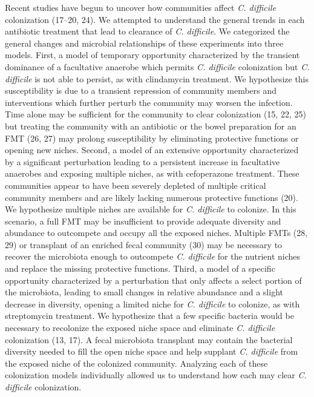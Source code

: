 \documentclass[11pt,]{article}
\begin{document}
Recent studies have begun to uncover how communities affect \emph{C.
difficile} colonization (17--20, 24). We attempted to understand the
general trends in each antibiotic treatment that lead to clearance of
\emph{C. difficile}. We categorized the general changes and microbial
relationships of these experiments into three models. First, a model of
temporary opportunity characterized by the transient dominance of a
facultative anaerobe which permits \emph{C. difficile} colonization but
\emph{C. difficile} is not able to persist, as with clindamycin
treatment. We hypothesize this susceptibility is due to a transient
repression of community members and interventions which further perturb
the community may worsen the infection. Time alone may be sufficient for
the community to clear colonization (15, 22, 25) but treating the
community with an antibiotic or the bowel preparation for an FMT (26,
27) may prolong susceptibility by eliminating protective functions or
opening new niches. Second, a model of an extensive opportunity
characterized by a significant perturbation leading to a persistent
increase in facultative anaerobes and exposing multiple niches, as with
cefoperazone treatment. These communities appear to have been severely
depleted of multiple critical community members and are likely lacking
numerous protective functions (20). We hypothesize multiple niches are
available for \emph{C. difficile} to colonize. In this scenario, a full
FMT may be insufficient to provide adequate diversity and abundance to
outcompete and occupy all the exposed niches. Multiple FMTs (28, 29) or
transplant of an enriched fecal community (30) may be necessary to
recover the microbiota enough to outcompete \emph{C. difficile} for the
nutrient niches and replace the missing protective functions. Third, a
model of a specific opportunity characterized by a perturbation that
only affects a select portion of the microbiota, leading to small
changes in relative abundance and a slight decrease in diversity,
opening a limited niche for \emph{C. difficile} to colonize, as with
streptomycin treatment. We hypothesize that a few specific bacteria
would be necessary to recolonize the exposed niche space and eliminate
\emph{C. difficile} colonization (13, 17). A fecal microbiota transplant
may contain the bacterial diversity needed to fill the open niche space
and help supplant \emph{C. difficile} from the exposed niche of the
colonized community. Analyzing each of these colonization models
individually allowed us to understand how each may clear \emph{C.
difficile} colonization.
\end{document}
